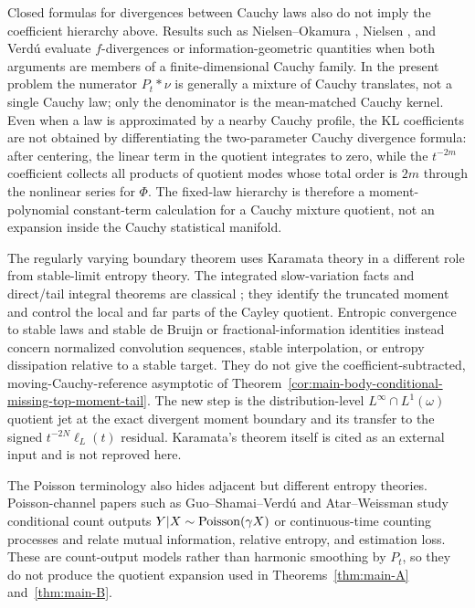 Closed formulas for divergences between Cauchy laws also do not imply the
coefficient hierarchy above.  Results such as Nielsen--Okamura
\cite{NielsenOkamura2023Cauchy}, Nielsen
\cite{Nielsen2020CauchyVoronoi}, and Verd{\'u}
\cite{Verdu2023Cauchy} evaluate \(f\)-divergences or information-geometric
quantities when both arguments are members of a finite-dimensional Cauchy
family.  In the present problem the numerator \(P_t*\nu\) is generally a
mixture of Cauchy translates, not a single Cauchy law; only the denominator is
the mean-matched Cauchy kernel.  Even when a law is approximated by a nearby
Cauchy profile, the KL coefficients are not obtained by differentiating the
two-parameter Cauchy divergence formula: after centering, the linear term in
the quotient integrates to zero, while the \(t^{-2m}\) coefficient collects
all products of quotient modes whose total order is \(2m\) through the
nonlinear series for \(\Phi\).  The fixed-law hierarchy is therefore a
moment-polynomial constant-term calculation for a Cauchy mixture quotient,
not an expansion inside the Cauchy statistical manifold.

The regularly varying boundary theorem uses Karamata theory in a different
role from stable-limit entropy theory.  The integrated slow-variation facts
and direct/tail integral theorems are classical
\cite{BinghamGoldieTeugels1987RegularVariation}; they identify the truncated
moment and control the local and far parts of the Cayley quotient.  Entropic
convergence to stable laws and stable de Bruijn or fractional-information
identities
\cite{BobkovChistyakovGotze2013StableEntropy,Johnson2013StableDeBruijn,
Toscani2016StableEntropy} instead concern normalized convolution sequences,
stable interpolation, or entropy dissipation relative to a stable target.
They do not give the coefficient-subtracted, moving-Cauchy-reference
asymptotic of
Theorem~\ref{cor:main-body-conditional-missing-top-moment-tail}.  The new
step is the distribution-level \(L^\infty\cap L^1(\omega)\) quotient jet at
the exact divergent moment boundary and its transfer to the signed
\(t^{-2N}\ell_L(t)\) residual.  Karamata's theorem itself is cited as an
external input and is not reproved here.

The Poisson terminology also hides adjacent but different entropy theories.
Poisson-channel papers such as Guo--Shamai--Verd{\'u}
\cite{GuoShamaiVerdu2008PoissonChannel} and Atar--Weissman
\cite{AtarWeissman2012PoissonChannel} study conditional count outputs
\(Y|X\sim{\rm Poisson}(\gamma X)\) or continuous-time counting processes and
relate mutual information, relative entropy, and estimation loss.  These are
count-output models rather than harmonic smoothing by \(P_t\), so they do not
produce the quotient expansion used in Theorems~\ref{thm:main-A}
and~\ref{thm:main-B}.


